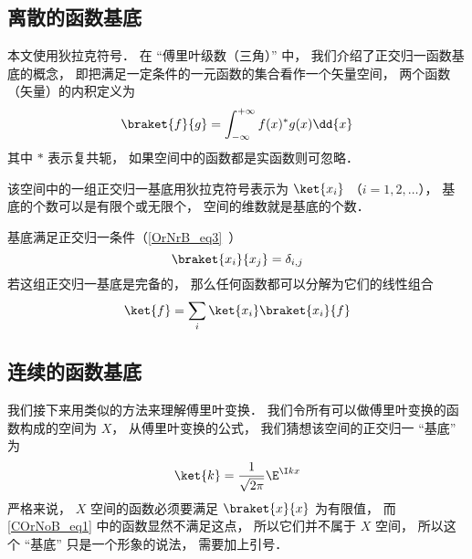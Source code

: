 

\subsection{离散的函数基底}
本文使用狄拉克符号． 在 “傅里叶级数（三角）” 中， 我们介绍了正交归一函数基底的概念， 即把满足一定条件的一元函数的集合看作一个矢量空间， 两个函数（矢量）的内积定义为
\begin{equation}
\braket{f}{g} = \int_{-\infty}^{+\infty} f(x)^* g(x) \dd{x}
\end{equation}
其中 $*$ 表示复共轭， 如果空间中的函数都是实函数则可忽略．

该空间中的一组正交归一基底用狄拉克符号表示为 $\ket{x_i}$ （$i = 1, 2,\dots$）， 基底的个数可以是有限个或无限个， 空间的维数就是基底的个数．

基底满足正交归一条件（\autoref{OrNrB_eq3}~）
\begin{equation}
\braket{x_i}{x_j} = \delta_{i,j}
\end{equation}
若这组正交归一基底是完备的， 那么任何函数都可以分解为它们的线性组合
\begin{equation}
\ket{f} = \sum_i \ket{x_i}\braket{x_i}{f}
\end{equation}


\subsection{连续的函数基底}
我们接下来用类似的方法来理解傅里叶变换． 我们令所有可以做傅里叶变换的函数构成的空间为 $X$， 从傅里叶变换的公式， 我们猜想该空间的正交归一 “基底” 为
\begin{equation}\label{COrNoB_eq1}
\ket{k} = \frac{1}{\sqrt{2\pi}} \E^{\I kx}
\end{equation}
严格来说， $X$ 空间的函数必须要满足 $\braket{x}{x}$ 为有限值， 而\autoref{COrNoB_eq1} 中的函数显然不满足这点， 所以它们并不属于 $X$ 空间， 所以这个 “基底” 只是一个形象的说法， 需要加上引号．
